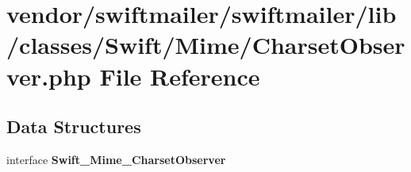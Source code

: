 \section{vendor/swiftmailer/swiftmailer/lib/classes/\+Swift/\+Mime/\+Charset\+Observer.php File Reference}
\label{_charset_observer_8php}
\subsection*{Data Structures}
\begin{DoxyCompactItemize}
\item 
interface {\bf Swift\+\_\+\+Mime\+\_\+\+Charset\+Observer}
\end{DoxyCompactItemize}
